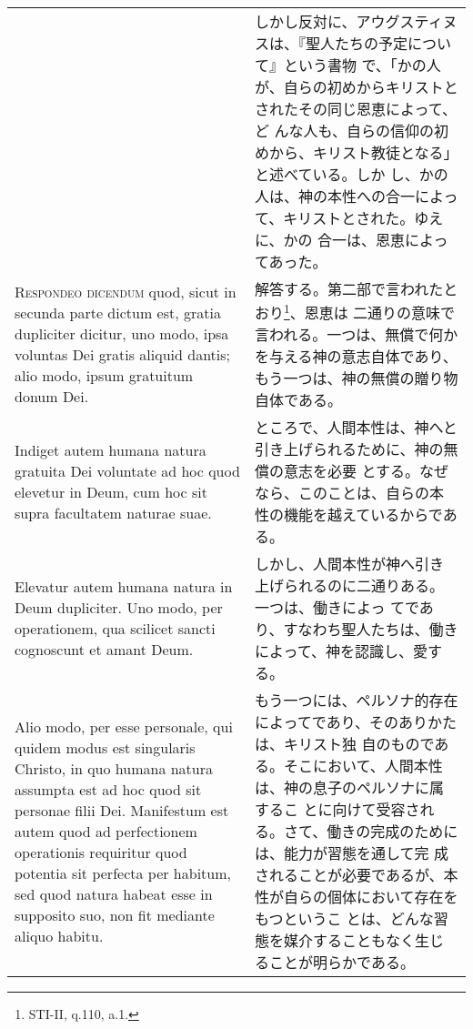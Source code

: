 \documentclass[10pt]{jsarticle} %
\begin{document}
\begin{longtable}{p{21em}p{21em}}
&

しかし反対に、アウグスティヌスは、『聖人たちの予定について』という書物
で、「かの人が、自らの初めからキリストとされたその同じ恩恵によって、ど
んな人も、自らの信仰の初めから、キリスト教徒となる」と述べている。しか
し、かの人は、神の本性への合一によって、キリストとされた。ゆえに、かの
合一は、恩恵によってあった。

\\



{\scshape Respondeo dicendum} quod, sicut in secunda parte dictum est,
gratia dupliciter dicitur, uno modo, ipsa voluntas Dei gratis aliquid
dantis; alio modo, ipsum gratuitum donum Dei.

&

解答する。第二部で言われたとおり\footnote{STI-II, q.110, a.1.}、恩恵は
二通りの意味で言われる。一つは、無償で何かを与える神の意志自体であり、
もう一つは、神の無償の贈り物自体である。


\\

Indiget autem humana natura gratuita Dei voluntate ad hoc quod
elevetur in Deum, cum hoc sit supra facultatem naturae suae.

&

ところで、人間本性は、神へと引き上げられるために、神の無償の意志を必要
とする。なぜなら、このことは、自らの本性の機能を越えているからである。

\\

Elevatur autem humana natura in Deum dupliciter. Uno modo, per
operationem, qua scilicet sancti cognoscunt et amant Deum.

&

しかし、人間本性が神へ引き上げられるのに二通りある。一つは、働きによっ
てであり、すなわち聖人たちは、働きによって、神を認識し、愛する。

\\

Alio modo, per esse personale, qui quidem modus est singularis
Christo, in quo humana natura assumpta est ad hoc quod sit personae
filii Dei. Manifestum est autem quod ad perfectionem operationis
requiritur quod potentia sit perfecta per habitum, sed quod natura
habeat esse in supposito suo, non fit mediante aliquo habitu.

&


もう一つには、ペルソナ的存在によってであり、そのありかたは、キリスト独
自のものである。そこにおいて、人間本性は、神の息子のペルソナに属するこ
とに向けて受容される。さて、働きの完成のためには、能力が習態を通して完
成されることが必要であるが、本性が自らの個体において存在をもつというこ
とは、どんな習態を媒介することもなく生じることが明らかである。


\end{longtable}
\end{document}
